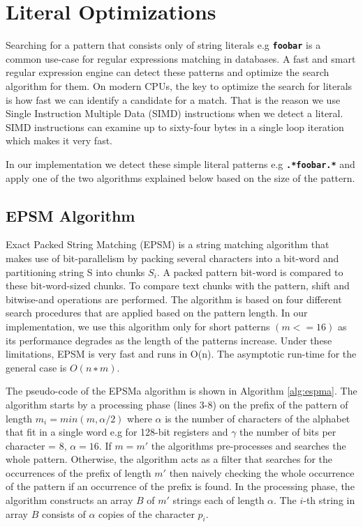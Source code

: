 \section{Literal Optimizations}\label{section:simdopt}
Searching for a pattern that consists only of string literals e.g \texttt{\textbf{foobar}} is a common use-case for regular expressions matching in databases. A fast and smart regular expression engine can detect these patterns and optimize the search algorithm for them. On modern CPUs, the key to optimize the search for literals is how fast we can identify a candidate for a match. That is the reason we use Single Instruction Multiple Data (SIMD) instructions when we detect a literal. SIMD instructions can examine up to sixty-four bytes in a single loop iteration which makes it very fast.  

In our implementation we detect these simple literal patterns e.g \texttt{\textbf{.*foobar.*}} and apply one of the two algorithms explained below based on the size of the pattern.

\subsection{EPSM Algorithm}
Exact Packed String Matching (EPSM) \cite{epsm} is a string matching algorithm that makes use of bit-parallelism by packing several characters into a bit-word and partitioning string S into chunks $S_i$. A packed pattern bit-word is compared to these bit-word-sized chunks. To compare text chunks with the pattern, shift and bitwise-and operations are performed. The algorithm is based on four different search procedures that are applied based on the pattern length. In our implementation, we use this algorithm only for short patterns $(m <= 16)$ as its performance degrades as the length of the patterns increase. Under these limitations, EPSM is very fast and runs in O(n). The asymptotic run-time for the general case is $O(n ∗ m)$.

The pseudo-code of the EPSMa algorithm is shown in Algorithm \ref{alg:espma}. The algorithm starts by a processing phase (lines 3-8) on the prefix of the pattern of length $m_i = min(m, \alpha/2)$ where $\alpha$ is the number of characters of the alphabet that fit in a single word e.g for 128-bit registers and $\gamma$ the number of bits per character = 8, $\alpha = 16$. If $m = m'$ the algorithms pre-processes and searches the whole pattern. Otherwise, the algorithm acts as a filter that searches for the occurrences of the prefix of length $m'$ then naively checking the whole occurrence of the pattern if an occurrence of the prefix is found. In the processing phase, the algorithm  constructs an array $B$ of $m'$ strings each of length $\alpha$. The $i$-th string in array $B$ consists of $\alpha$ copies of the character $p_i$.

